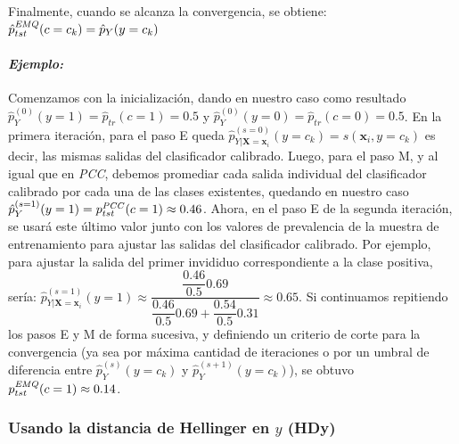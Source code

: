 Finalmente, cuando se alcanza la convergencia, se obtiene: $\hat
p^{\it{EMQ}}_{tst}(c=c_k) = \hat p_{Y}(y=c_k)$

\paragraph{\it Ejemplo:\/} Comenzamos con la inicialización, dando en nuestro
caso como resultado $\hat p^{(0)}_{Y}(y=1) = \hat p_{tr}(c=1) = 0.5$ y $\hat
p^{(0)}_{Y}(y=0) = \hat p_{tr}(c=0) = 0.5$. En la primera iteración, para el
paso E queda $\hat p^{(s=0)}_{Y|\boldsymbol{X}=\boldsymbol{x}_i}(y=c_k) =
s(\boldsymbol{x}_i, y=c_k)$ es decir, las mismas salidas del clasificador
calibrado. Luego, para el paso M, y al igual que en {\it PCC}, debemos promediar
cada salida individual del clasificador calibrado por cada una de las clases
existentes, quedando en nuestro caso $\hat p^{(s=1)}_{Y}(y=1) =
p^{\it{PCC}}_{tst}(c=1) \approx 0.46$. Ahora, en el paso E de la segunda
iteración, se usará este último valor junto con los valores de prevalencia de la
muestra de entrenamiento para ajustar las salidas del clasificador calibrado.
Por ejemplo, para ajustar la salida del primer invididuo correspondiente a la
clase positiva, sería: $\hat p^{(s=1)}_{Y|\boldsymbol{X}=\boldsymbol{x}_i}(y=1)
\approx
\dfrac{\dfrac{0.46}{0.5}0.69}{\dfrac{0.46}{0.5}0.69+\dfrac{0.54}{0.5}0.31}
\approx 0.65$. Si continuamos repitiendo los pasos E y M de forma sucesiva, y
definiendo un criterio de corte para la convergencia (ya sea por máxima cantidad
de iteraciones o por un umbral de diferencia entre $\hat p^{(s)}_{Y}(y=c_k)$ y
$\hat p^{(s+1)}_{Y}(y=c_k)$), se obtuvo $p^{\it{EMQ}}_{tst}(c=1) \approx 0.14$.

\subsubsection{Usando la distancia de Hellinger en $y$ (HDy)}\label{puntual:hdy}

